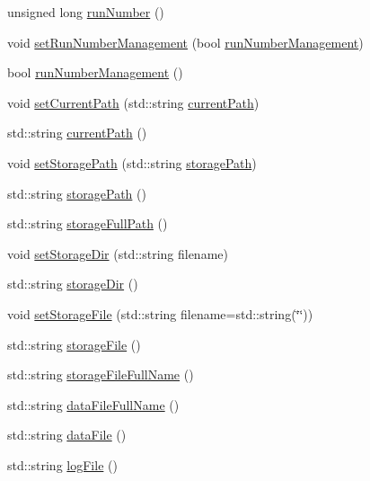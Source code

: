 \begin{DoxyCompactItemize}
\item 
unsigned long \hyperlink{classOptions_a2d9447919fe90f9ce8df5530526cbb27}{run\+Number} ()
\item 
void \hyperlink{classOptions_a7bf3fb2833021f8900eb105b0a9c02c5}{set\+Run\+Number\+Management} (bool \hyperlink{classOptions_a7654a2c3d67baae08f61edc18bec367e}{run\+Number\+Management})
\item 
bool \hyperlink{classOptions_a7654a2c3d67baae08f61edc18bec367e}{run\+Number\+Management} ()
\item 
void \hyperlink{classOptions_a3cebd8308183414ef2e0de0e7922c87a}{set\+Current\+Path} (std\+::string \hyperlink{classOptions_ab9cf7442a712fe8593f6cf5cfff36a5d}{current\+Path})
\item 
std\+::string \hyperlink{classOptions_ab9cf7442a712fe8593f6cf5cfff36a5d}{current\+Path} ()
\item 
void \hyperlink{classOptions_a8c32e222956c77ed2ec5387318f91394}{set\+Storage\+Path} (std\+::string \hyperlink{classOptions_a3992b9247441a3e60e55c8c5fe32b394}{storage\+Path})
\item 
std\+::string \hyperlink{classOptions_a3992b9247441a3e60e55c8c5fe32b394}{storage\+Path} ()
\item 
std\+::string \hyperlink{classOptions_aa5fe6b85088f3012226869480790a383}{storage\+Full\+Path} ()
\item 
void \hyperlink{classOptions_aed5e6919526bcfa5cf4961230bd20e37}{set\+Storage\+Dir} (std\+::string filename)
\item 
std\+::string \hyperlink{classOptions_a5e8026ed2674f8f5db444b52fea27fda}{storage\+Dir} ()
\item 
void \hyperlink{classOptions_ac163281337998af5ca3b7a9617337fef}{set\+Storage\+File} (std\+::string filename=std\+::string(\char`\"{}\char`\"{}))
\item 
std\+::string \hyperlink{classOptions_a6661fe4edd501f7e97527b8f9354ef84}{storage\+File} ()
\item 
std\+::string \hyperlink{classOptions_a68c501133588cd4b1c80219adb926e8d}{storage\+File\+Full\+Name} ()
\item 
std\+::string \hyperlink{classOptions_ab1cd9f237e9c18fd72323c74565453f8}{data\+File\+Full\+Name} ()
\item 
std\+::string \hyperlink{classOptions_a166984c16a957bf2e8e0f0a1ce39eb73}{data\+File} ()
\item 
std\+::string \hyperlink{classOptions_a739a9b788fc937ad55d10d6b47ff1e8c}{log\+File} ()
\item 

\end{DoxyCompactItemize}
